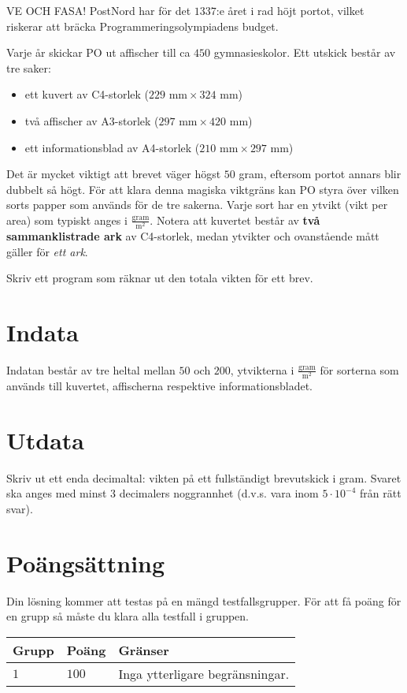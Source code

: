 VE OCH FASA!
PostNord har för det $1337$:e året i rad höjt portot, vilket riskerar att bräcka Programmeringsolympiadens budget.

Varje år skickar PO ut affischer till ca $450$ gymnasieskolor.
Ett utskick består av tre saker: 
\begin{itemize}
\item ett kuvert av C4-storlek ($229\text{ mm} \times 324\text{ mm}$)
\item två affischer av A3-storlek ($297\text{ mm} \times 420\text{ mm}$)
\item ett informationsblad av A4-storlek ($210\text{ mm} \times 297\text{ mm}$)
\end{itemize}

Det är mycket viktigt att brevet väger högst $50$ gram, eftersom portot annars blir dubbelt så högt.
För att klara denna magiska viktgräns kan PO styra över vilken sorts papper som används för de tre sakerna.
Varje sort har en ytvikt (vikt per area) som typiskt anges i $\frac{\text{gram}}{\text{m}^2}$.
Notera att kuvertet består av \textbf{två sammanklistrade ark} av C4-storlek, medan ytvikter och ovanstående mått gäller för \emph{ett ark}.

Skriv ett program som räknar ut den totala vikten för ett brev.

\section*{Indata}
Indatan består av tre heltal mellan $50$ och $200$, ytvikterna i $\frac{\text{gram}}{\text{m}^2}$ för sorterna som används till kuvertet, affischerna respektive informationsbladet.

\section*{Utdata}
Skriv ut ett enda decimaltal: vikten på ett fullständigt brevutskick i gram.
Svaret ska anges med minst $3$ decimalers noggrannhet (d.v.s. vara inom $5 \cdot 10^{-4}$ från rätt svar).

\section*{Poängsättning}
Din lösning kommer att testas på en mängd testfallsgrupper.
För att få poäng för en grupp så måste du klara alla testfall i gruppen.

\noindent
\begin{tabular}{| l | l | l |}
  \hline
  \textbf{Grupp} & \textbf{Poäng} & \textbf{Gränser} \\ \hline
  $1$   & $100$        & Inga ytterligare begränsningar. \\ \hline
\end{tabular}

